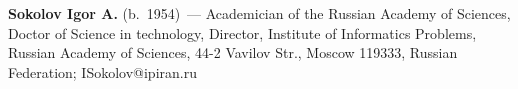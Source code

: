 \vspace*{3pt}

\noindent
\textbf{Sokolov Igor A.} (b.\ 1954)~---
Academician of the Russian Academy of Sciences,
Doctor of Science in technology, Director,  Institute of
Informatics Problems, Russian Academy of Sciences,
44-2 Vavilov Str., Moscow 119333, Russian Federation;
ISokolov@ipiran.ru
 \label{end\stat}

\renewcommand{\bibname}{\protect\rm Литература}